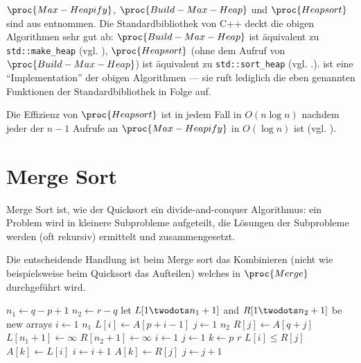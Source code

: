 $\proc{Max-Heapify}$, $\proc{Build-Max-Heap}$ und $\proc{Heapsort}$ sind aus \cite[154, 157]{clrs2001} entnommen. Die Standardbibliothek von C++ deckt die obigen Algorithmen sehr gut ab: $\proc{Build-Max-Heap}$ ist äquivalent zu \lstinline{std::make_heap} (vgl. \cite[933]{ISO-C++17}), $\proc{Heap\-sort}$ (ohne dem Aufruf von $\proc{Build-Max-Heap}$) ist äquivalent zu  \lstinline{std::sort_heap} (vgl. \cite[933]{ISO-C++17}.).  ist eine \enquote{Implementation} der obigen Algorithmen --- sie ruft lediglich die eben genannten Funktionen der Standardbibliothek in Folge auf.

Die Effizienz von $\proc{Heapsort}$ ist in jedem Fall in $O(n \log n)$ nachdem jeder der $n - 1$ Aufrufe an $\proc{Max-Heapify}$ in $O(\log n)$ ist (vgl. \cite[160]{clrs2001}).

\section{Merge Sort}
\label{sec:alg-merging}

Merge Sort ist, wie der Quicksort ein divide-and-conquer Algorithmus: ein Problem wird in kleinere Subprobleme aufgeteilt, die Lösungen der Subprobleme werden (oft rekursiv) ermittelt und zusammengesetzt.

Die entscheidende Handlung ist beim Merge sort das Kombinieren (nicht wie beispielsweise beim Quicksort das Aufteilen) welches in $\proc{Merge}$ durchgeführt wird.

\begin{codebox}
    \li $n_1 \gets q - p + 1$ \label{ln:merge-subarr-length-1}
    \li $n_2 \gets r - q$ \label{ln:merge-subarr-length-2}
    \li let $L[1 \twodots n_1 + 1]$ and $R[1 \twodots n_2 + 1]$ be new arrays \label{ln:merge-subarr-creation}
    \li \For $i \gets 1$ \To $n_1$ \label{ln:merge-copy-begin}
    \li     \Do
                $L[i] \gets A[p + i - 1]$
            \End
    \li \For $j \gets 1$ \To $n_2$ \label{ln:merge-copy-for-2}
    \li     \Do
                $R[j] \gets A[q + j]$
            \End \label{ln:merge-copy-end}
    \li $L[n_1 + 1] \gets \infty$ \label{ln:merge-infty-assign-1}
    \li $R[n_2 + 1] \gets \infty$ \label{ln:merge-infty-assign-2}
    \li $i \gets 1$
    \li $j \gets 1$ \label{ln:merge-index-setup-2}
    \li \For $k \gets p$ \To $r$ \label{ln:merge-for-begin}
    \li     \Do
                \If $L[i] \leq R[j]$
                    \Then
    \li                 $A[k] \gets L[i]$
    \li                 $i \gets i + 1$
                    \Else
                        $A[k] \gets R[j]$
    \li                 $j \gets j + 1$
                    \End
            \End \label{ln:merge-for-end}
\end{codebox}

